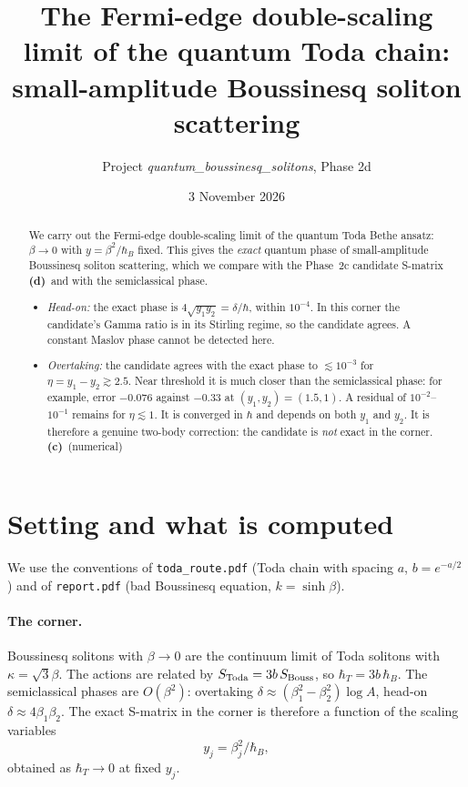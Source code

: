 \documentclass[11pt,a4paper]{article}
\title{The Fermi-edge double-scaling limit of the quantum Toda chain:\\ small-amplitude Boussinesq soliton scattering}
\author{Project \emph{quantum\_boussinesq\_solitons}, Phase 2d}
\date{3 November 2026}
\newcommand{\Lc}{\textsf{\textbf{(c)}}}\newcommand{\Ld}{\textsf{\textbf{(d)}}}
\begin{document}
\maketitle

\begin{abstract}
We carry out the Fermi-edge double-scaling limit of the quantum Toda Bethe ansatz: $\beta\to0$ with $y=\beta^2/\hbar_B$ fixed. This gives the \emph{exact} quantum phase of small-amplitude Boussinesq soliton scattering, which we compare with the Phase~2c candidate S-matrix \Ld\ and with the semiclassical phase.
\begin{itemize}
\item \emph{Head-on:} the exact phase is $4\sqrt{y_1y_2}=\delta/\hbar$, within $10^{-4}$. In this corner the candidate's Gamma ratio is in its Stirling regime, so the candidate agrees. A constant Maslov phase cannot be detected here.
\item \emph{Overtaking:} the candidate agrees with the exact phase to $\lesssim10^{-3}$ for $\eta=y_1-y_2\gtrsim2.5$. Near threshold it is much closer than the semiclassical phase: for example, error $-0.076$ against $-0.33$ at $(y_1,y_2)=(1.5,1)$. A residual of $10^{-2}$--$10^{-1}$ remains for $\eta\lesssim1$. It is converged in $\hbar$ and depends on both $y_1$ and $y_2$. It is therefore a genuine two-body correction: the candidate is \emph{not} exact in the corner. \Lc\ (numerical)
\end{itemize}
\end{abstract}

\section{Setting and what is computed}

We use the conventions of \texttt{toda\_route.pdf} (Toda chain with spacing $a$, $b=e^{-a/2}$) and of \texttt{report.pdf} (bad Boussinesq equation, $k=\sinh\beta$).

\paragraph{The corner.} Boussinesq solitons with $\beta\to0$ are the continuum limit of Toda solitons with $\kappa=\sqrt3\beta$. The actions are related by $S_{\rm Toda}=3b\,S_{\rm Bouss}$, so $\hbar_T=3b\,\hbar_B$. The semiclassical phases are $O(\beta^2)$: overtaking $\delta\approx(\beta_1^2-\beta_2^2)\log A$, head-on $\delta\approx4\beta_1\beta_2$. The exact S-matrix in the corner is therefore a function of the scaling variables
\[
y_j=\beta_j^2/\hbar_B ,
\]
obtained as $\hbar_T\to0$ at fixed $y_j$.
\end{document}
